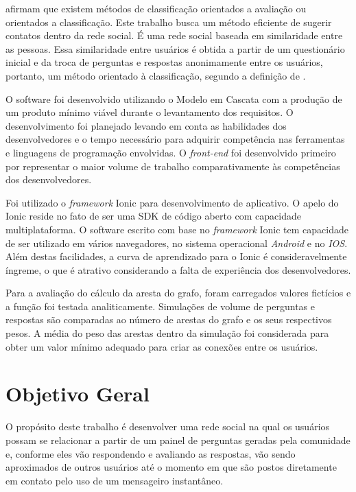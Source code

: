 \cite{Bita2016} afirmam que existem métodos de classificação orientados a avaliação ou orientados a classificação.
Este trabalho busca um método eficiente de sugerir contatos dentro da rede social. É uma rede social baseada em similaridade entre as pessoas. Essa similaridade entre usuários é obtida a partir de um questionário inicial e da troca de perguntas e respostas anonimamente entre os usuários, portanto, um método orientado à classificação, segundo a definição de \cite{Bita2016}.

O software foi desenvolvido utilizando o Modelo em Cascata com a produção de um produto mínimo viável durante o levantamento dos requisitos. O desenvolvimento foi planejado levando em conta as habilidades dos desenvolvedores e o tempo necessário para adquirir competência nas ferramentas e linguagens de programação envolvidas. O \emph{front-end} foi desenvolvido primeiro por representar o maior volume de trabalho comparativamente às competências dos desenvolvedores.

Foi utilizado o \emph{framework} Ionic para desenvolvimento de aplicativo. O apelo do Ionic reside no fato de ser uma SDK de código aberto com capacidade multiplataforma. O software escrito com base no \emph{framework} Ionic tem capacidade de ser utilizado em vários navegadores, no sistema operacional \emph{Android} e no \emph{IOS}. Além destas facilidades, a curva de aprendizado para o Ionic é consideravelmente íngreme, o que é atrativo considerando a falta de experiência dos desenvolvedores.

Para a avaliação do cálculo da aresta do grafo, foram carregados valores fictícios e a função foi testada analiticamente. Simulações de volume de perguntas e respostas são comparadas ao número de arestas do grafo e os seus respectivos pesos. A média do peso das arestas dentro da simulação foi considerada para obter um valor mínimo adequado para criar as conexões entre os usuários.

\section{Objetivo Geral}
O propósito deste trabalho é desenvolver uma rede social na qual os usuários possam se relacionar a partir de um painel de perguntas geradas pela comunidade e, conforme eles vão respondendo e avaliando  as respostas, vão sendo aproximados de outros usuários até o momento em que são postos diretamente em contato pelo uso de um mensageiro instantâneo.

